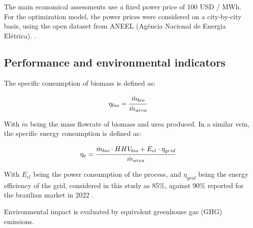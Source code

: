 \documentclass[a4paper, titlepage]{article}
\begin{document}
The main economical assessments use a fixed power price of 100 USD / MWh. For the optimization model, the power prices
were considered on a city-by-city basis, using the open dataset from ANEEL (Agência Nacional de Energia Elétrica).
\cite{ANEELPortalReports}.

\subsection{Performance and environmental indicators}

The specific consumption of biomass is defined as:

\begin{equation}
	\eta_{bio} = \cfrac{\dot m_{bio}}{\dot m_{urea}}
\end{equation}

With $\dot m$ being the mass flowrate of biomass and urea produced. In a similar vein, the specific energy consumption
is defined as:

\begin{equation}
	\eta _e = \cfrac{\dot m_{bio} \cdot HHV_{bio} + E_{el} \cdot \eta _{grid}}{\dot m_{urea}}
\end{equation}

With $E_{el}$ being the power consumption of the process, and $\eta _{grid}$ being the energy efficiency of the grid,
considered in this study as 85\%, against 90\% reported for the brazilian market in 2022
\cite{epeBENBalancoEnergetico2023}.

Environmental impact is evaluated by equivalent greenhouse gas (GHG) emissions. \textcite{jonkerEconomicPerformanceGHG2019}








\printbibliography{}
\end{document}
